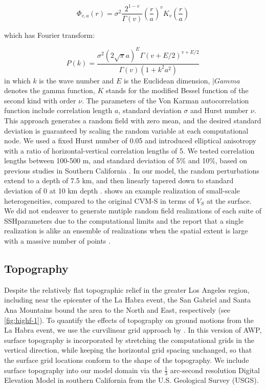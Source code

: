\begin{equation}\label{eq:highf-1}
  \Phi_{v, a}(r)=\sigma^{2} \frac{2^{1-v}}{\Gamma(v)}\left(\frac{r}{a}\right)^{v} K_{v}\left(\frac{r}{a}\right)
\end{equation}

\noindent which has Fourier transform:

\begin{equation}\label{eq:highf-2}
  P(k)=\frac{\sigma^{2}(2 \sqrt{\pi} a)^{E} \Gamma(v+E / 2)^{v+E / 2}}{\Gamma(v)\left(1+k^{2} a^{2}\right)}
\end{equation}
\noindent in which $k$ is the wave number and $E$ is the Euclidean dimension, $|Gamma$ denotes the gamma function, $K$ stands for the modiﬁed Bessel function of the second kind with order $\nu$. The parameters of the Von Karman autocorrelation function include correlation length $a$, standard deviation $\sigma$ and Hurst number $\nu$. This approach generates a random field with zero mean, and the desired standard deviation is guaranteed by scaling the random variable at each computational node. We used a fixed Hurst number of 0.05 and introduced elliptical anisotropy with a ratio of horizontal-vertical correlation lengths of 5. We tested correlation lengths between 100-500 m, and standard deviation of 5\% and 10\%, based on previous studies in Southern California . In our model, the random perturbations extend to a depth of 7.5 km, and then linearly tapered down to standard deviation of 0 at 10 km depth \citep{liEvaluationOneDimensionalMultiDirectional2018}.  shows an example realization of small-scale heterogeneities, compared to the original CVM-S in terms of $V_S$ at the surface. We did not endeaver to generate mutiple random field realizations of each suite of SSHparameters due to the computational limits and the report that a single realization is alike an ensemble of realizations when the spatial extent is large with a massive number of points \citep{hartzellEffects3DRandom2010}.

\subsection{Topography}
Despite the relatively flat topographic relief in the greater Los Angeles region, including near the epicenter of the La Habra event, the San Gabriel and Santa Ana Mountains bound the area to the North and East, respectively (see \cref{fig:highf-1}). To quantify the effects of topography on ground motions from the La Habra event, we use the curvilinear grid approach by \citet{oreillyHighorderFiniteDifference2021}. In this version of AWP, surface topography is incorporated by stretching the computational grids in the vertical direction, while keeping the horizontal grid spacing unchanged, so that the surface grid locations conform to the shape of the topography. We include surface topography into our model domain via the $\frac{1}{3}$ arc-second resolution Digital Elevation Model in southern California from the U.S. Geological Survey (USGS).

